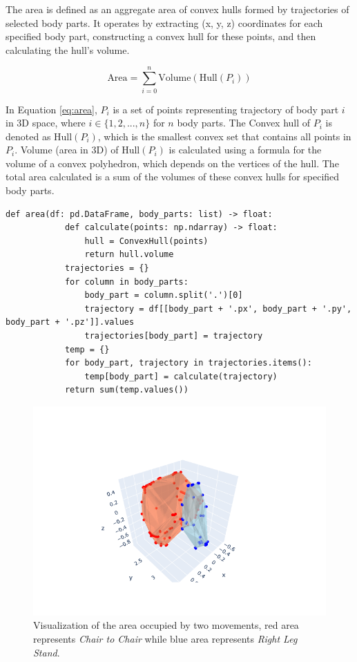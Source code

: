                 The area is defined as an aggregate area of convex hulls formed by trajectories of selected body parts. It operates by extracting (x, y, z) coordinates for each specified body part, constructing a convex hull for these points, and then calculating the hull's volume.

                \begin{equation}\label{eq:area}
                    \text{Area} = \sum_{i=0}^{n} \text{Volume}(\text{Hull}(P_i))
                \end{equation}
            
                In Equation \ref{eq:area}, $P_i$ is a set of points representing trajectory of body part $i$ in 3D space, where $i \in \{1, 2, ..., n\}$ for $n$ body parts. The Convex hull of $P_i$ is denoted as $\text{Hull}(P_i)$, which is the smallest convex set that contains all points in $P_i$. Volume (area in 3D) of $\text{Hull}(P_i)$ is calculated using a formula for the volume of a convex polyhedron, which depends on the vertices of the hull. The total area calculated is a sum of the volumes of these convex hulls for specified body parts.
                
        \begin{lstlisting}[caption={Area calculation method using ConvexHull class from SciPy library \cite{2020SciPy-NMeth}.}] 
        def area(df: pd.DataFrame, body_parts: list) -> float:
            def calculate(points: np.ndarray) -> float:
                hull = ConvexHull(points)
                return hull.volume
            trajectories = {}
            for column in body_parts:
                body_part = column.split('.')[0]
                trajectory = df[[body_part + '.px', body_part + '.py', body_part + '.pz']].values
                trajectories[body_part] = trajectory
            temp = {}
            for body_part, trajectory in trajectories.items():
                temp[body_part] = calculate(trajectory)
            return sum(temp.values())
        \end{lstlisting}

                \begin{figure}[H]
                    \centering
                    \includegraphics[width=.6\textwidth]{../src/resources/plots/feat-eng/area_difference.png}
                    \caption{
                        Visualization of the area occupied by two movements, red area represents \textit{Chair to Chair} while blue area represents \textit{Right Leg Stand}. 
                    }
                    \label{fig:area}
                \end{figure}
            
